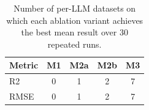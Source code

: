 \begin{table}[t]
\centering
\small
\caption{Number of per-LLM datasets on which each ablation variant achieves the best mean result over 30 repeated runs.}
\label{tab:ablation_win_counts}
\begin{tabular}{lcccc}
\toprule
Metric & M1 & M2a & M2b & M3 \\
\midrule
R2 & 0 & 1 & 2 & 7 \\
RMSE & 0 & 1 & 2 & 7 \\
\bottomrule
\end{tabular}
\end{table}